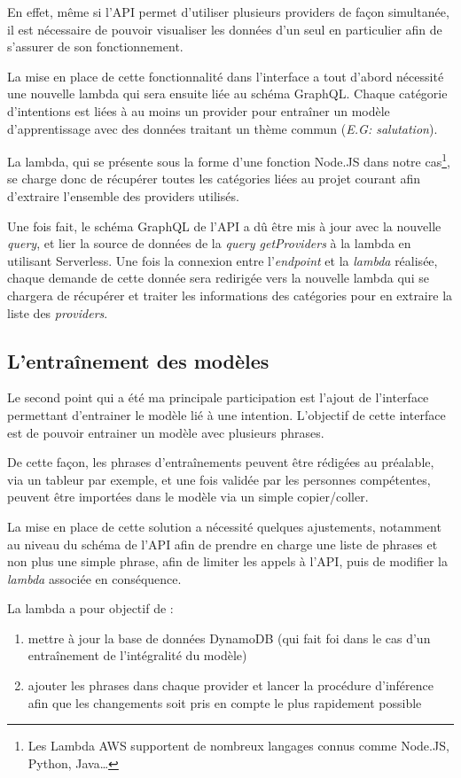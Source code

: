 \documentclass[12pt,a4paper,oneside]{scrreprt}
\begin{document}
En effet, même si l'API permet d'utiliser plusieurs providers de façon simultanée, il est nécessaire de pouvoir visualiser les données d'un seul en particulier afin de s'assurer de son fonctionnement.

La mise en place de cette fonctionnalité dans l'interface a tout d'abord nécessité une nouvelle lambda qui sera ensuite liée au schéma GraphQL. Chaque catégorie d'intentions est liées à au moins un provider pour entraîner un modèle d'apprentissage avec des données traitant un thème commun (\textit{E.G: salutation}).

La lambda, qui se présente sous la forme d'une fonction Node.JS dans notre cas\footnote{Les Lambda AWS supportent de nombreux langages connus comme Node.JS, Python, Java\dots}, se charge donc de récupérer toutes les catégories liées au projet courant afin d'extraire l'ensemble des providers utilisés.

Une fois fait, le schéma GraphQL de l'API a dû être mis à jour avec la nouvelle \textit{query}, et lier la source de données de la \textit{query getProviders} à la lambda en utilisant Serverless. Une fois la connexion entre l'\textit{endpoint} et la \textit{lambda} réalisée, chaque demande de cette donnée sera redirigée vers la nouvelle lambda qui se chargera de récupérer et traiter les informations des catégories pour en extraire la liste des \textit{providers}.

\subsection{L'entraînement des modèles}

Le second point qui a été ma principale participation est l'ajout de l'interface permettant d'entrainer le modèle lié à une intention. L'objectif de cette interface est de pouvoir entrainer un modèle avec plusieurs phrases.

De cette façon, les phrases d'entraînements peuvent être rédigées au préalable, via un tableur par exemple, et une fois validée par les personnes compétentes, peuvent être importées dans le modèle via un simple copier/coller.

La mise en place de cette solution a nécessité quelques ajustements, notamment au niveau du schéma de l'API afin de prendre en charge une liste de phrases et non plus une simple phrase, afin de limiter les appels à l'API, puis de modifier la \textit{lambda} associée en conséquence.

La lambda a pour objectif de :
\begin{enumerate}
	\item mettre à jour la base de données DynamoDB (qui fait foi dans le cas d'un entraînement de l'intégralité du modèle)
	\item ajouter les phrases dans chaque provider et lancer la procédure d'inférence afin que les changements soit pris en compte le plus rapidement possible
\end{enumerate}
\end{document}
